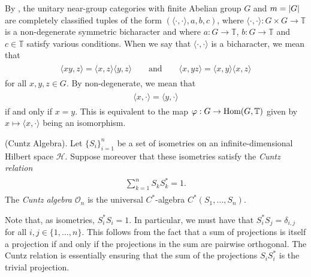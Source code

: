 \noindent By \cite[Theorem 9.1]{Izu17}, the unitary near-group categories with finite Abelian group $G$ and $m = \lvert G\rvert$ are completely classified tuples of the form $(\langle\cdot,\cdot\rangle, a, b, c)$, where $\langle\cdot,\cdot\rangle : G \times G \to \mathbb{T}$ is a non-degenerate symmetric bicharacter and where $a : G \to \mathbb{T}$, $b : G \to \mathbb{T}$ and $c \in \mathbb{T}$ satisfy various conditions. When we say that $\langle\cdot,\cdot\rangle$ is a bicharacter, we mean that
\begin{align*}
\begin{split}
\langle xy, z\rangle = \langle x, z\rangle\langle y, z\rangle\qquad\text{and}\qquad\langle x, yz\rangle = \langle x, y\rangle\langle x, z\rangle
\end{split}
\end{align*}
for all $x, y, z \in G$. By non-degenerate, we mean that
\begin{align*}
\begin{split}
\langle x, \cdot\rangle = \langle y, \cdot\rangle
\end{split}
\end{align*}
\noindent if and only if $x = y$. This is equivalent to the map $\varphi : G \to \textup{Hom}(G, \mathbb{T})$ given by $x \mapsto \langle x, \cdot\rangle$ being an isomorphism.\\

\noindent\begin{definition}\textup{(Cuntz Algebra).} Let $\{S_i\}_{i=1}^n$ be a set of isometries on an infinite-dimensional Hilbert space $\mathscr{H}$. Suppose moreover that these isometries satisfy the {\em Cuntz relation}
\begin{align*}
\begin{split}
\sum_{k=1}^n S_kS_k^* = 1.
\end{split}
\end{align*}
\noindent The {\em Cuntz algebra $\mathcal{O}_n$} is the universal $C^*$-algebra $C^*(S_1, \dots, S_n)$.\\
\end{definition}

\noindent\begin{remark} Note that, as isometries, $S_i^*S_i = 1$. In particular, we must have that $S_i^*S_j = \delta_{i,j}$ for all $i, j \in \{1, \dots, n\}$. This follows from the fact that a sum of projections is itself a projection if and only if the projections in the sum are pairwise orthogonal. The Cuntz relation is essentially ensuring that the sum of the projections $S_iS_i^*$ is the trivial projection.\\
\end{remark}

